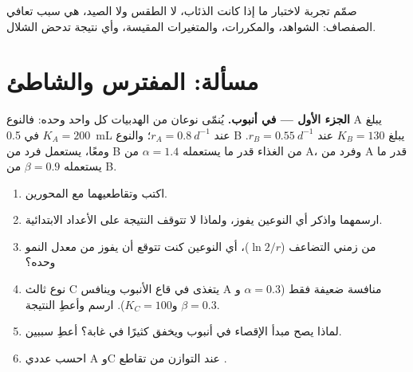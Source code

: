 \begin{exercise}[$\star\star\star$]\label{exo:b1:species-interactions:12}
صمّم تجربة لاختبار ما إذا كانت الذئاب، لا الطقس ولا الصيد، هي
سبب تعافي الصفصاف: الشواهد، والمكررات،
والمتغيرات المقيسة، وأي نتيجة تدحض الشلال.
\end{exercise}

\section{مسألة: المفترس والشاطئ}

\begin{problem}
\label{pb:b1:species-interactions:1}

\medskip
\noindent\textbf{الجزء الأول ---  في أنبوب.}
يُنمّى نوعان من الهدبيات كل واحد وحده: فالنوع A يبلغ $K_A = 200$ في
\qty{0.5}{mL} عند $r_A = \qty{0.8}{d^{-1}}$؛ والنوع B يبلغ
$K_B = 130$ عند $r_B = \qty{0.55}{d^{-1}}$. ومعًا، يستعمل فرد
من B من الغذاء قدر ما يستعمله $\alpha = 1.4$ من A، وفرد من A
قدر ما يستعمله $\beta = 0.9$ من B.
\begin{enumerate}
  \item اكتب  وتقاطعيهما مع المحورين.
  \item ارسمهما واذكر أي النوعين يفوز، ولماذا لا تتوقف النتيجة
        على الأعداد الابتدائية.
  \item من زمني التضاعف ($\ln 2/r$)، أي النوعين كنت تتوقع أن
        يفوز من معدل النمو وحده؟
  \item نوع ثالث C يتغذى في قاع الأنبوب وينافس
        A منافسة ضعيفة فقط ($\alpha = 0.3$ و$\beta = 0.3$ و$K_C = 100$).
        ارسم  وأعطِ النتيجة.
  \item لماذا يصح مبدأ الإقصاء في أنبوب ويخفق كثيرًا
        في غابة؟ أعطِ سببين.
  \item احسب عددي A وC عند التوازن من تقاطع
        .
\end{enumerate}


\end{problem}
